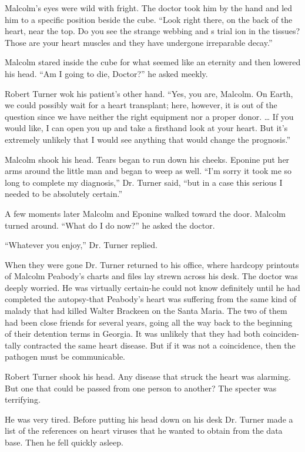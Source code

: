 \documentclass[]{article}
\begin{document}
{Malcolm’s eyes were wild with fright.  The doctor took him by the hand and led him to a specific position beside the cube.  “Look right there, on the back of the heart, near the top.  Do you see the strange webbing and s trial ion in the tissues? Those are your heart muscles and they have undergone irreparable decay.”

Malcolm stared inside the cube for what seemed like an eternity and then lowered his head.  “Am I going to die, Doctor?” he asked meekly.

Robert Turner wok his patient’s other hand.  “Yes, you are, Malcolm.  On Earth, we could possibly wait for a heart transplant; here, however, it is out of the question since we have neither the right equipment nor a proper donor.  … If you would like, I can open you up and take a firsthand look at your heart.  But it’s extremely unlikely that I would see anything that would change the prognosis.”

Malcolm shook his head.  Tears began to run down his cheeks.  Eponine put her arms around the little man and began to weep as well.  “I’m sorry it took me so long to complete my diagnosis,” Dr.  Turner said, “but in a case this serious I needed to be absolutely certain.”

A few moments later Malcolm and Eponine walked toward the door.  Malcolm turned around.  “What do I do now?” he asked the doctor.

“Whatever you enjoy,” Dr.  Turner replied.

When they were gone Dr.  Turner returned to his office, where hardcopy printouts of Malcolm Peabody’s charts and files lay strewn across his desk.  The doctor was deeply worried.  He was virtually certain-he could not know definitely until he had completed the autopsy-that Peabody’s heart was suffering from the same kind of malady that had killed Walter Brackeen on the Santa Maria.  The two of them had been close friends for several years, going all the way back to the beginning of their detention terms in Georgia.  It was unlikely that they had both coinciden-tally contracted the same heart disease.  But if it was not a coincidence, then the pathogen must be communicable.

Robert Turner shook his head.  Any disease that struck the heart was alarming.  But one that could be passed from one person to another? The specter was terrifying.

He was very tired.  Before putting his head down on his desk Dr.  Turner made a list of the references on heart viruses that he wanted to obtain from the data base.  Then he fell quickly asleep.

}
\end{document}
